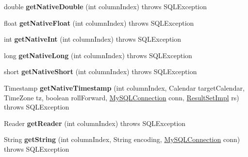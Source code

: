 \begin{DoxyCompactItemize}
double {\bfseries get\+Native\+Double} (int column\+Index)  throws S\+Q\+L\+Exception 
\item 
\mbox{\label{classcom_1_1mysql_1_1jdbc_1_1_buffer_row_a1a968f3ef81d6c1c0101d36a0495ec26}} 
float {\bfseries get\+Native\+Float} (int column\+Index)  throws S\+Q\+L\+Exception 
\item 
\mbox{\label{classcom_1_1mysql_1_1jdbc_1_1_buffer_row_afec9632b717c3aa97be7c8c18f516665}} 
int {\bfseries get\+Native\+Int} (int column\+Index)  throws S\+Q\+L\+Exception 
\item 
\mbox{\label{classcom_1_1mysql_1_1jdbc_1_1_buffer_row_a411de1bf3c9177a5a8dd50f35fece3b8}} 
long {\bfseries get\+Native\+Long} (int column\+Index)  throws S\+Q\+L\+Exception 
\item 
\mbox{\label{classcom_1_1mysql_1_1jdbc_1_1_buffer_row_a12b5a5d9edf9701ecf8d54147ed59e21}} 
short {\bfseries get\+Native\+Short} (int column\+Index)  throws S\+Q\+L\+Exception 
\item 
\mbox{\label{classcom_1_1mysql_1_1jdbc_1_1_buffer_row_abcd45c08d370ae0d06e730576925bd39}} 
Timestamp {\bfseries get\+Native\+Timestamp} (int column\+Index, Calendar target\+Calendar, Time\+Zone tz, boolean roll\+Forward, \mbox{\hyperlink{interfacecom_1_1mysql_1_1jdbc_1_1_my_s_q_l_connection}{My\+S\+Q\+L\+Connection}} conn, \mbox{\hyperlink{classcom_1_1mysql_1_1jdbc_1_1_result_set_impl}{Result\+Set\+Impl}} rs)  throws S\+Q\+L\+Exception 
\item 
\mbox{\label{classcom_1_1mysql_1_1jdbc_1_1_buffer_row_a6b8f15e913a13da69d00a6f57aa9cfaa}} 
Reader {\bfseries get\+Reader} (int column\+Index)  throws S\+Q\+L\+Exception 
\item 
\mbox{\label{classcom_1_1mysql_1_1jdbc_1_1_buffer_row_a84df9c4bdfd795bbc33ea88ca46ea651}} 
String {\bfseries get\+String} (int column\+Index, String encoding, \mbox{\hyperlink{interfacecom_1_1mysql_1_1jdbc_1_1_my_s_q_l_connection}{My\+S\+Q\+L\+Connection}} conn)  throws S\+Q\+L\+Exception 

\end{DoxyCompactItemize}
